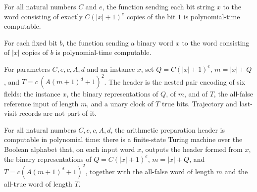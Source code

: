 \begin{lemma}
\label{Complexity.clNative_unary}
\leanok
{}
For all natural numbers $C$ and $e$, the function sending each bit string $x$ to the
word consisting of exactly $C(|x|+1)^e$ copies of the bit $1$ is polynomial-time
computable.
\end{lemma}

\begin{lemma}
\label{Complexity.clNative_fill}
\leanok
{}
For each fixed bit $b$, the function sending a binary word $x$ to the word consisting of
$|x|$ copies of $b$ is polynomial-time computable.
\end{lemma}

\begin{definition}
\label{Complexity.clPrepHeader}
\leanok
{}
For parameters $C, e, c, A, d$ and an instance $x$, set $Q = C(|x|+1)^e$, $m = |x| + Q$, and $T = c\,(A(m+1)^d+1)^2$. The header is the nested pair encoding of six fields: the instance $x$, the binary representations of $Q$, of $m$, and of $T$, the all-false reference input of length $m$, and a unary clock of $T$ true bits. Trajectory and last-visit records are not part of it.
\end{definition}

\begin{lemma}
\label{Complexity.clPrepHeader_native}
\leanok
{}
For all natural numbers $C,e,c,A,d$, the arithmetic preparation header is computable in
polynomial time: there is a finite-state Turing machine over the Boolean alphabet that,
on each input word $x$, outputs the header formed from $x$, the binary representations
of $Q=C(|x|+1)^e$, $m=|x|+Q$, and $T=c(A(m+1)^d+1)^2$, together with the all-false word
of length $m$ and the all-true word of length $T$.
\end{lemma}

